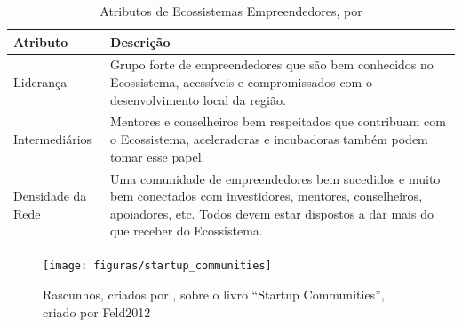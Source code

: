 \begin{table}[!htb]
	\centering
	\label{tabela:attributes_of_entrepreneurship_ecosystems}
	\begin{tabular}{ | p{3cm} | p{12cm} | }
		\hline
		Atributo & Descrição \\ \hline
		Liderança & Grupo forte de empreendedores que são bem conhecidos no Ecossistema, acessíveis e compromissados com o desenvolvimento local da região. \\ \hline
		Intermediários & Mentores e conselheiros bem respeitados que contribuam com o Ecossistema, aceleradoras e incubadoras também podem tomar esse papel. \\ \hline
		Densidade da Rede & Uma comunidade de empreendedores bem sucedidos e muito bem conectados com investidores, mentores, conselheiros, apoiadores, etc. Todos devem estar dispostos a dar mais do que receber do Ecossistema. \\ \hline
	\end{tabular}
	\caption{Atributos de Ecossistemas Empreendedores, por \cite{Spigel2015}}
\end{table}

\begin{figure}[!htb]
\centering
\texttt{[image: figuras/startup\_communities]}
\caption{Rascunhos, criados por , sobre o livro ``Startup Communities'', criado por {Feld2012}}
\label{figure:startup_communities}
\end{figure}







